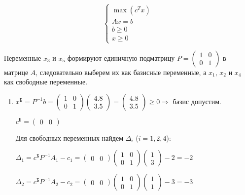 \begin{equation}
\begin{cases}
	\max (c^Tx) \\
	A x = b \\
	b \ge 0 \\
	x \ge 0
\end{cases}
\end{equation}

Переменные $x_3$ и $x_5$ формируют единичную подматрицу $P = \left( \begin{smallmatrix} 1 & 0 \\ 0 & 1 \end{smallmatrix} \right)$ в матрице $A$, следовательно выберем их как базисные переменные, а $x_1$, $x_2$ и $x_4$ как свободные переменные.

\begin{enumerate}[leftmargin=*]

\item
$x^\text{Б} = P^{-1}b =
\begin{pmatrix}
	1 & 0 \\
	0 & 1 
\end{pmatrix}
\begin{pmatrix}
	4.8 \\
	3.5
\end{pmatrix} =
\begin{pmatrix}
	4.8 \\
	3.5
\end{pmatrix} \geq 0
\Rightarrow$ базис допустим.

$c^\text{Б} = 
\begin{pmatrix}
	0 & 0
\end{pmatrix}$

Для свободных переменных найдем $\Delta_i$ ($i = 1, 2, 4$):

$\Delta_1 = c^\text{Б} P^{-1} A_1 - c_1 =
\begin{pmatrix}
	0 & 0
\end{pmatrix}
\begin{pmatrix}
	1 & 0 \\
	0 & 1 
\end{pmatrix}
\begin{pmatrix}
	1 \\
	3
\end{pmatrix} - 2 = -2$

$\Delta_2 = c^\text{Б} P^{-1} A_2 - c_2 =
\begin{pmatrix}
	0 & 0
\end{pmatrix}
\begin{pmatrix}
	1 & 0 \\
	0 & 1 
\end{pmatrix}
\begin{pmatrix}
	1 \\
	1
\end{pmatrix} - 3 = -3$


\end{enumerate}
